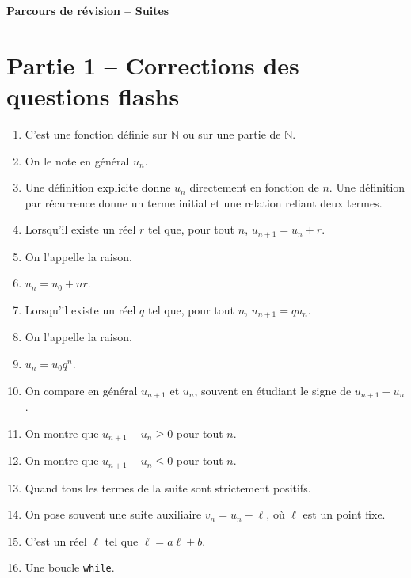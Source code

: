 \documentclass[11pt,a4paper]{article}
\newcounter{question}
\newcounter{reponse}
\newenvironment{blocreponses}[1]{%
  \begin{tcolorbox}[enhanced,breakable,colback=bleuclair,colframe=bleufonce,boxrule=0.6pt,arc=2mm,left=2mm,right=2mm,top=2mm,bottom=1.5mm,title={\bfseries #1},coltitle=white,colbacktitle=bleufonce,before skip=3mm,after skip=3mm, fontupper=\large]
  \large
  \begin{enumerate}[leftmargin=*,label=\textbf{\arabic*.},itemsep=0.45em,topsep=0.5em]
  \setcounter{enumi}{\value{reponse}}
}{%
  \setcounter{reponse}{\value{enumi}}
  \end{enumerate}
  \end{tcolorbox}
}
\begin{document}
\begin{center}
{\LARGE\bfseries Parcours de révision -- Suites}\\[1mm]

\end{center}
\vspace{2mm}
\tableofcontents
\clearpage

\section*{Partie 1 -- Corrections des questions flashs}
\setcounter{reponse}{0}
\begin{blocreponses}{Réponses -- A. Vocabulaire et formules de base}
  \item C'est une fonction définie sur \(\mathbb{N}\) ou sur une partie de \(\mathbb{N}\).
  \item On le note en général \(u_n\).
  \item Une définition explicite donne \(u_n\) directement en fonction de \(n\). Une définition par récurrence donne un terme initial et une relation reliant deux termes.
  \item Lorsqu'il existe un réel \(r\) tel que, pour tout \(n\), \(u_{n+1}=u_n+r\).
  \item On l'appelle la raison.
  \item \(u_n=u_0+nr\).
  \item Lorsqu'il existe un réel \(q\) tel que, pour tout \(n\), \(u_{n+1}=q u_n\).
  \item On l'appelle la raison.
  \item \(u_n=u_0q^n\).
  \item On compare en général \(u_{n+1}\) et \(u_n\), souvent en étudiant le signe de \(u_{n+1}-u_n\).
  \item On montre que \(u_{n+1}-u_n\geqslant 0\) pour tout \(n\).
  \item On montre que \(u_{n+1}-u_n\leqslant 0\) pour tout \(n\).
  \item Quand tous les termes de la suite sont strictement positifs.
  \item On pose souvent une suite auxiliaire \(v_n=u_n-\ell\), où \(\ell\) est un point fixe.
  \item C'est un réel \(\ell\) tel que \(\ell=a\ell+b\).
  \item Une boucle \texttt{while}.
\end{blocreponses}
\end{document}
